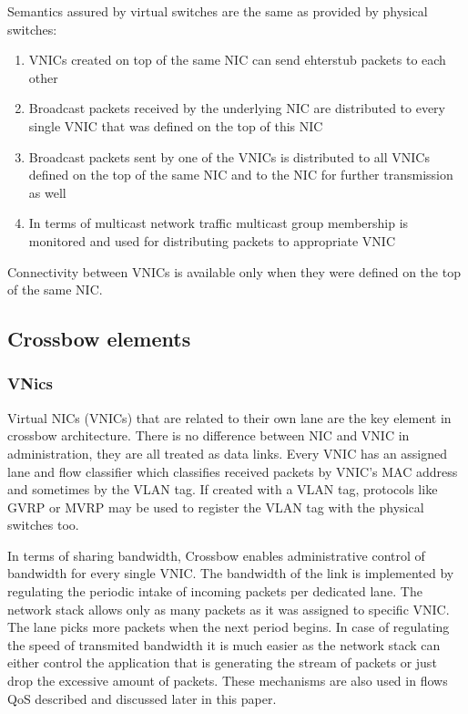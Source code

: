 \documentclass[11pt]{book}
\begin{document}
			Semantics assured by virtual switches are the same as provided by physical switches: 
			\begin{enumerate}
				\item{VNICs created on top of the same NIC can send ehterstub packets to each other}
				\item{Broadcast packets received by the underlying NIC are distributed to every single VNIC that was defined on the top of this NIC}
				\item{Broadcast packets sent by one of the VNICs is distributed to all VNICs defined on the top of the same NIC and to the NIC for further transmission as well}
				\item{In terms of multicast network traffic multicast group membership is monitored and used for distributing packets to appropriate VNIC}
			\end{enumerate}

			Connectivity between VNICs is available only when they were defined on the top of the same NIC. 

		
		\subsection{Crossbow elements}

			\subsubsection{VNics}
			Virtual NICs (VNICs) that are related to their own lane are the key element in crossbow architecture. There is no
			difference between NIC and VNIC in administration, they are all treated as data links. Every VNIC has an assigned
			lane and flow classifier which classifies received packets by VNIC's MAC address and sometimes by the VLAN tag.
			If created with a VLAN tag, protocols like GVRP or MVRP may be used to register the VLAN tag with the physical switches
			too.	

			In terms of sharing bandwidth, Crossbow enables administrative control of bandwidth for every single VNIC. The bandwidth of the link
			is implemented by regulating the periodic intake of incoming packets per dedicated lane. The network stack allows only as many packets as it was 
			assigned to specific VNIC. The lane picks more packets when the next period begins. In case of regulating the speed of transmited bandwidth it is much
			easier as the network stack can either control the application that is generating the stream of packets or just drop the excessive amount of packets.
			These mechanisms are also used in flows QoS described and discussed later in this paper.
\end{document}
